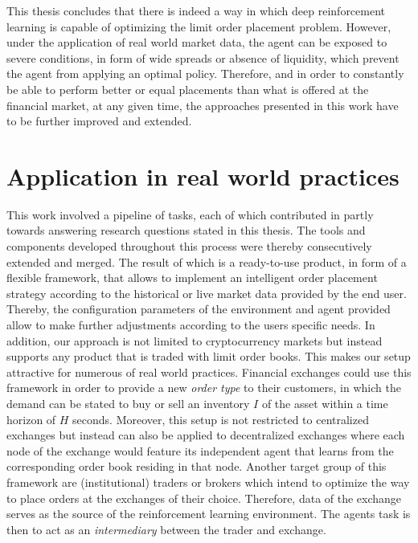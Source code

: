 This thesis concludes that there is indeed a way in which deep reinforcement learning is capable of optimizing the limit order placement problem.
However, under the application of real world market data, the agent can be exposed to severe conditions, in form of wide spreads or absence of liquidity, which prevent the agent from applying an optimal policy.
Therefore, and in order to constantly be able to perform better or equal placements than what is offered at the financial market, at any given time, the approaches presented in this work have to be further improved and extended.

\section{Application in real world practices}

This work involved a pipeline of tasks, each of which contributed in partly towards answering research questions stated in this thesis.
The tools and components developed throughout this process were thereby consecutively extended and merged.
The result of which is a ready-to-use product, in form of a flexible framework, that allows to implement an intelligent order placement strategy according to the historical or live market data provided by the end user.
Thereby, the configuration parameters of the environment and agent provided allow to make further adjustments according to the users specific needs.
In addition, our approach is not limited to cryptocurrency markets but instead supports any product that is traded with limit order books.
This makes our setup attractive for numerous of real world practices.
Financial exchanges could use this framework in order to provide a new \textit{order type} to their customers, in which the demand can be stated to buy or sell an inventory $I$ of the asset within a time horizon of $H$ seconds.
Moreover, this setup is not restricted to centralized exchanges but instead can also be applied to decentralized exchanges where each node of the exchange would feature its independent agent that learns from the corresponding order book residing in that node.
Another target group of this framework are (institutional) traders or brokers which intend to optimize the way to place orders at the exchanges of their choice.
Therefore, data of the exchange serves as the source of the reinforcement learning environment. 
The agents task is then to act as an \textit{intermediary} between the trader and exchange.